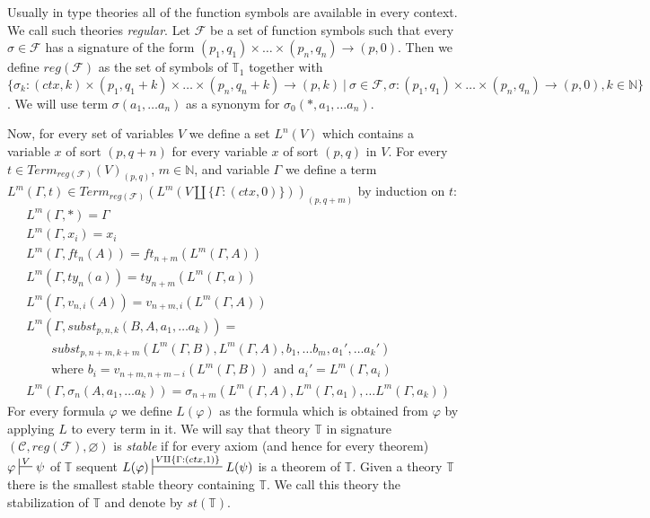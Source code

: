 \documentclass{amsart}
\theoremstyle{definition}
\theoremstyle{remark}
\numberwithin{figure}{section}
\begin{document}
Usually in type theories all of the function symbols are available in every context.
We call such theories \emph{regular}.
Let $\mathcal{F}$ be a set of function symbols such that every $\sigma \in \mathcal{F}$ has a signature of the form $(p_1,q_1) \times \ldots \times (p_n,q_n) \to (p,0)$.
Then we define $reg(\mathcal{F})$ as the set of symbols of $\mathbb{T}_1$ together with $\{ \sigma_k : (ctx, k) \times (p_1, q_1 + k) \times \ldots \times (p_n, q_n + k) \to (p, k) \ |\ \sigma \in \mathcal{F}, \sigma : (p_1,q_1) \times \ldots \times (p_n,q_n) \to (p,0), k \in \mathbb{N} \}$.
We will use term $\sigma(a_1, \ldots a_n)$ as a synonym for $\sigma_0(*, a_1, \ldots a_n)$.

Now, for every set of variables $V$ we define a set $L^n(V)$ which contains a variable $x$ of sort $(p,q+n)$ for every variable $x$ of sort $(p,q)$ in $V$.
For every $t \in Term_{reg(\mathcal{F})}(V)_{(p,q)}$, $m \in \mathbb{N}$, and variable $\Gamma$ we define a term $L^m(\Gamma, t) \in Term_{reg(\mathcal{F})}(L^m(V \amalg \{ \Gamma : (ctx,0) \}))_{(p,q+m)}$ by induction on $t$:
\begin{align*}
& L^m(\Gamma, *) = \Gamma \\
& L^m(\Gamma, x_i) = x_i \\
& L^m(\Gamma, ft_n(A)) = ft_{n+m}(L^m(\Gamma, A)) \\
& L^m(\Gamma, ty_n(a)) = ty_{n+m}(L^m(\Gamma, a)) \\
& L^m(\Gamma, v_{n,i}(A)) = v_{n+m,i}(L^m(\Gamma, A)) \\
& L^m(\Gamma, subst_{p,n,k}(B, A, a_1, \ldots a_k)) = \\
& \qquad subst_{p,n+m,k+m}(L^m(\Gamma, B), L^m(\Gamma, A), b_1, \ldots b_m, a_1', \ldots a_k') \\
& \qquad \text{where $b_i = v_{n+m,n+m-i}(L^m(\Gamma, B))$ and $a_i' = L^m(\Gamma, a_i)$ } \\
& L^m(\Gamma, \sigma_n(A, a_1, \ldots a_k)) = \sigma_{n+m}(L^m(\Gamma, A), L^m(\Gamma, a_1), \ldots L^m(\Gamma, a_k))
\end{align*}
For every formula $\varphi$ we define $L(\varphi)$ as the formula which is obtained from $\varphi$ by applying $L$ to every term in it.
We will say that theory $\mathbb{T}$ in signature $(\mathcal{C}, reg(\mathcal{F}), \varnothing)$ is \emph{stable}
if for every axiom (and hence for every theorem) $\varphi \sststile{}{V} \psi$ of $\mathbb{T}$ sequent $L(\varphi) \sststile{}{V \amalg \{ \Gamma : (ctx,1) \}} L(\psi)$ is a theorem of $\mathbb{T}$.
Given a theory $\mathbb{T}$ there is the smallest stable theory containing $\mathbb{T}$.
We call this theory the stabilization of $\mathbb{T}$ and denote by $st(\mathbb{T})$.
\end{document}
